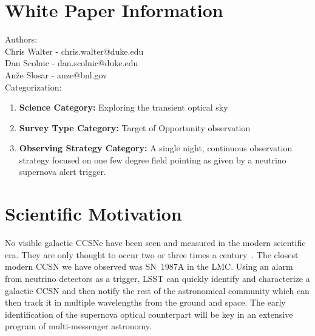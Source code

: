 \documentclass[12pt, letterpaper]{article}
\begin{document}
\newpage

\section{White Paper Information}

\noindent
Authors: \\

\noindent
Chris Walter - chris.walter@duke.edu \\
Dan Scolnic - dan.scolnic@duke.edu \\
An\v{z}e Slosar - anze@bnl.gov \\

\noindent
Categorization: 
\begin{enumerate} 
\item {\bf Science Category:}  Exploring the transient optical sky
\item {\bf Survey Type Category:}  Target of Opportunity observation
\item {\bf Observing Strategy Category:}  A single night, continuous
  observation strategy focused on one few degree field pointing as given by
  a neutrino supernova alert trigger.
\end{enumerate}  

\clearpage

\section{Scientific Motivation}
\label{sec:motivation}

No visible galactic CCSNe have been seen and measured in the modern
scientific era. They are only thought to occur two or three times a
century~\cite{1994ApJS...92..487T, 2001ASSL..264..199C}.  The closest
modern CCSN we have observed was SN~1987A in the LMC.  Using an alarm
from neutrino detectors as a trigger, LSST can quickly identify and
characterize a galactic CCSN and then notify the rest of the
astronomical community which can then track it in multiple wavelengths
from the ground and space.  The early identification of the supernova
optical counterpart will be key in an extensive program of
multi-messenger astronomy.
\end{document}
